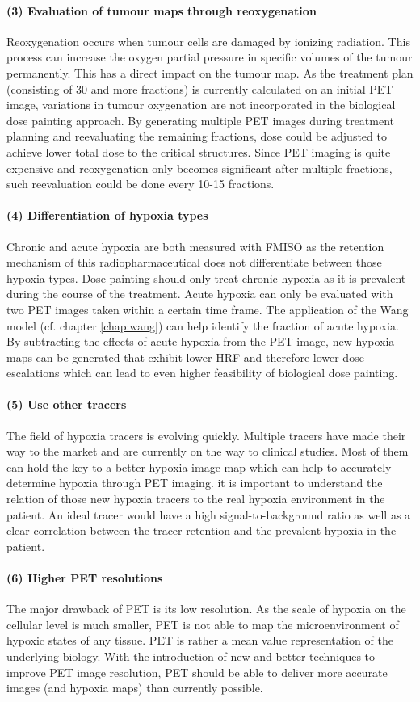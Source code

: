 \paragraph{(3) Evaluation of tumour maps through reoxygenation} Reoxygenation occurs when tumour cells are damaged by ionizing radiation. This process can increase the oxygen partial pressure in specific volumes of the tumour permanently. This has a direct impact on the tumour map. As the treatment plan (consisting of 30 and more fractions) is currently calculated on an initial PET image, variations in tumour oxygenation are not incorporated in the biological dose painting approach. By generating multiple PET images during treatment planning and reevaluating the remaining fractions, dose could be adjusted to achieve lower total dose to the critical structures. Since PET imaging is quite expensive and reoxygenation only becomes significant after multiple fractions, such reevaluation could be done every 10-15 fractions. 
\paragraph{(4) Differentiation of hypoxia types} Chronic and acute hypoxia are both measured with FMISO as the retention mechanism of this radiopharmaceutical does not differentiate between those hypoxia types. Dose painting should only treat chronic hypoxia as it is prevalent during the course of the treatment. Acute hypoxia can only be evaluated with two PET images taken within a certain time frame. The application of the Wang model (cf. chapter \ref{chap:wang}) can help identify the fraction of acute hypoxia. By subtracting the effects of acute hypoxia from the PET image, new hypoxia maps can be generated that exhibit lower HRF and therefore lower dose escalations which can lead to even higher feasibility of biological dose painting.
\paragraph{(5) Use other tracers} The field of hypoxia tracers is evolving quickly. Multiple tracers have made their way to the market and are currently on the way to clinical studies. Most of them can hold the key to a better hypoxia image map which can help to accurately determine hypoxia through PET imaging. it is important to understand the relation of those new hypoxia tracers to the real hypoxia environment in the patient. An ideal tracer would have a high signal-to-background ratio as well as a clear correlation between the tracer retention and the prevalent hypoxia in the patient. 
\paragraph{(6) Higher PET resolutions} The major drawback of PET is its low resolution. As the scale of hypoxia on the cellular level is much smaller, PET is not able to map the microenvironment of hypoxic states of any tissue. PET is rather a mean value representation of the underlying biology. With the introduction of new and better techniques to improve PET image resolution, PET should be able to deliver more accurate images (and hypoxia maps) than currently possible.